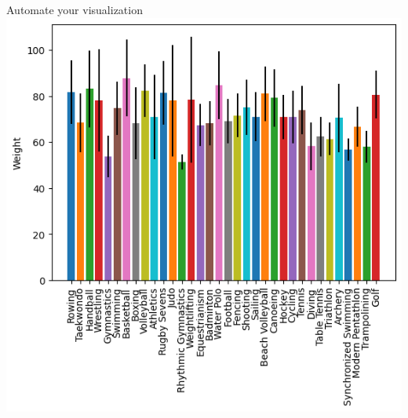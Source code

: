 \documentclass[
  ignorenonframetext,
]{beamer}
\begin{document}
\begin{frame}{Automate your visualization}
\label{automate-your-visualization-5}
\includegraphics{../images/im252.png}
\end{frame}
\end{document}
